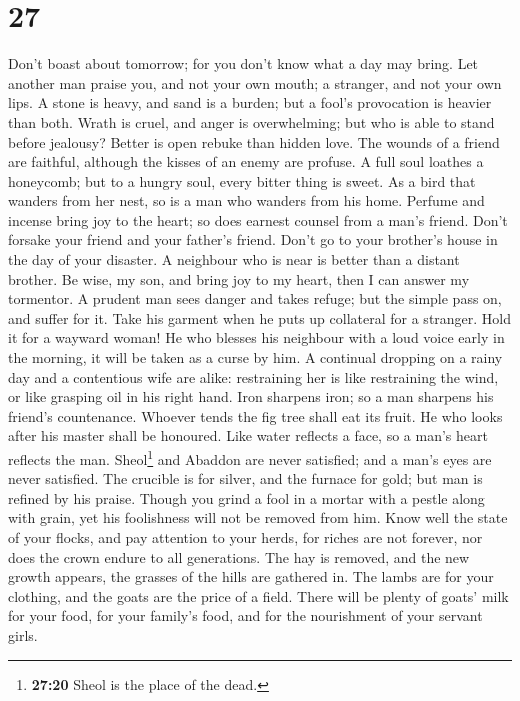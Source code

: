 \hypertarget{section-26}{%
\section{27}\label{section-26}}

 Don't boast about tomorrow; for you don't know what a day
may bring.  Let another man praise you, and not your own
mouth; a stranger, and not your own lips.  A stone is
heavy, and sand is a burden; but a fool's provocation is heavier than
both.  Wrath is cruel, and anger is overwhelming; but who
is able to stand before jealousy?  Better is open rebuke
than hidden love.  The wounds of a friend are faithful,
although the kisses of an enemy are profuse.  A full soul
loathes a honeycomb; but to a hungry soul, every bitter thing is sweet.
 As a bird that wanders from her nest, so is a man who
wanders from his home.  Perfume and incense bring joy to
the heart; so does earnest counsel from a man's friend. 
Don't forsake your friend and your father's friend. Don't go to your
brother's house in the day of your disaster. A neighbour who is near is
better than a distant brother.  Be wise, my son, and
bring joy to my heart, then I can answer my tormentor.  A
prudent man sees danger and takes refuge; but the simple pass on, and
suffer for it.  Take his garment when he puts up
collateral for a stranger. Hold it for a wayward woman! 
He who blesses his neighbour with a loud voice early in the morning, it
will be taken as a curse by him.  A continual dropping on
a rainy day and a contentious wife are alike: 
restraining her is like restraining the wind, or like grasping oil in
his right hand.  Iron sharpens iron; so a man sharpens
his friend's countenance.  Whoever tends the fig tree
shall eat its fruit. He who looks after his master shall be honoured.
 Like water reflects a face, so a man's heart reflects
the man.  Sheol\footnote{\textbf{27:20} Sheol is the
  place of the dead.} and Abaddon are never satisfied; and a man's eyes
are never satisfied.  The crucible is for silver, and the
furnace for gold; but man is refined by his praise. 
Though you grind a fool in a mortar with a pestle along with grain, yet
his foolishness will not be removed from him.  Know well
the state of your flocks, and pay attention to your herds,
 for riches are not forever, nor does the crown endure to
all generations.  The hay is removed, and the new growth
appears, the grasses of the hills are gathered in.  The
lambs are for your clothing, and the goats are the price of a field.
 There will be plenty of goats' milk for your food, for
your family's food, and for the nourishment of your servant girls.

